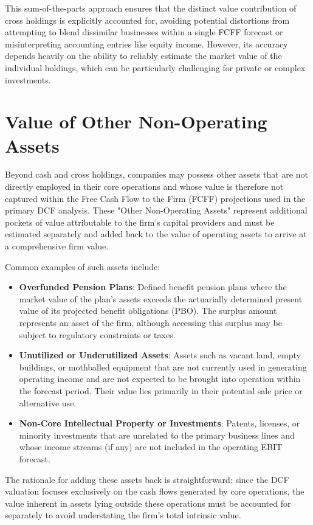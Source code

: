 This sum-of-the-parts approach ensures that the distinct value contribution of cross holdings is explicitly accounted for, avoiding potential distortions from attempting to blend dissimilar businesses within a single FCFF forecast or misinterpreting accounting entries like equity income. However, its accuracy depends heavily on the ability to reliably estimate the market value of the individual holdings, which can be particularly challenging for private or complex investments.

\section{Value of Other Non-Operating Assets}

Beyond cash and cross holdings, companies may possess other assets that are not directly employed in their core operations and whose value is therefore not captured within the Free Cash Flow to the Firm (FCFF) projections used in the primary DCF analysis. These "Other Non-Operating Assets" represent additional pockets of value attributable to the firm's capital providers and must be estimated separately and added back to the value of operating assets to arrive at a comprehensive firm value.

Common examples of such assets include:
\begin{itemize}
    \item \textbf{Overfunded Pension Plans}: Defined benefit pension plans where the market value of the plan's assets exceeds the actuarially determined present value of its projected benefit obligations (PBO). The surplus amount represents an asset of the firm, although accessing this surplus may be subject to regulatory constraints or taxes.
    \item \textbf{Unutilized or Underutilized Assets}: Assets such as vacant land, empty buildings, or mothballed equipment that are not currently used in generating operating income and are not expected to be brought into operation within the forecast period. Their value lies primarily in their potential sale price or alternative use.
    \item \textbf{Non-Core Intellectual Property or Investments}: Patents, licenses, or minority investments that are unrelated to the primary business lines and whose income streams (if any) are not included in the operating EBIT forecast.
\end{itemize}

The rationale for adding these assets back is straightforward: since the DCF valuation focuses exclusively on the cash flows generated by core operations, the value inherent in assets lying outside these operations must be accounted for separately to avoid understating the firm's total intrinsic value.


